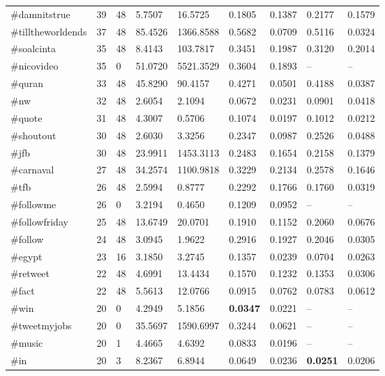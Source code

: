 \documentclass{llncs}
\begin{document}
\begin{table}[ht*]
\begin{tabular}{ l|l|l|l|l|l|l|l|l }
\#damnitstrue & 39 & 48 & 5.7507 & 16.5725 & 0.1805 & 0.1387 & 0.2177 & 0.1579 \\
\#tilltheworldends & 37 & 48 & 85.4526 & 1366.8588 & 0.5682 & 0.0709 & 0.5116 & 0.0324 \\
\#soalcinta & 35 & 48 & 8.4143 & 103.7817 & 0.3451 & 0.1987 & 0.3120 & 0.2014 \\
\#nicovideo & 35 & 0 & 51.0720 & 5521.3529 & 0.3604 & 0.1893 & -- & -- \\
\#quran & 33 & 48 & 45.8290 & 90.4157 & 0.4271 & 0.0501 & 0.4188 & 0.0387 \\
\#nw & 32 & 48 & 2.6054 & 2.1094 & 0.0672 & 0.0231 & 0.0901 & 0.0418 \\
\#quote & 31 & 48 & 4.3007 & 0.5706 & 0.1074 & 0.0197 & 0.1012 & 0.0212 \\
\#shoutout & 30 & 48 & 2.6030 & 3.3256 & 0.2347 & 0.0987 & 0.2526 & 0.0488 \\
\#jfb & 30 & 48 & 23.9911 & 1453.3113 & 0.2483 & 0.1654 & 0.2158 & 0.1379 \\
\#carnaval & 27 & 48 & 34.2574 & 1100.9818 & 0.3229 & 0.2134 & 0.2578 & 0.1646 \\
\#tfb & 26 & 48 & 2.5994 & 0.8777 & 0.2292 & 0.1766 & 0.1760 & 0.0319 \\
\#followme & 26 & 0 & 3.2194 & 0.4650 & 0.1209 & 0.0952 &	-- &	-- \\
\#followfriday & 25 & 48 & 13.6749 & 20.0701 & 0.1910 & 0.1152 & 0.2060 & 0.0676 \\
\#follow & 24 & 48 & 3.0945 & 1.9622 & 0.2916 & 0.1927 & 0.2046 & 0.0305 \\
\#egypt & 23 & 16 & 3.1850 & 3.2745 & 0.1357 & 0.0239 & 0.0704 & 0.0263 \\
\#retweet & 22 & 48 & 4.6991 & 13.4434 & 0.1570 & 0.1232 & 0.1353 & 0.0306 \\
\#fact & 22 & 48 & 5.5613 & 12.0766 & 0.0915 & 0.0762 & 0.0783 & 0.0612 \\
\#win & 20 & 0 & 4.2949 & 5.1856 & \textbf{0.0347} & 0.0221 & -- & -- \\
\#tweetmyjobs & 20 & 0 & 35.5697 & 1590.6997 & 0.3244 & 0.0621 & -- & -- \\
\#music & 20 & 1 & 4.4665 & 4.6392 & 0.0833 & 0.0196 & -- & -- \\
\#in & 20 & 3	& 8.2367 & 6.8944 & 0.0649 & 0.0236 & \textbf{0.0251} & 0.0206 \\

\end{tabular}
\end{table}
\end{document}
